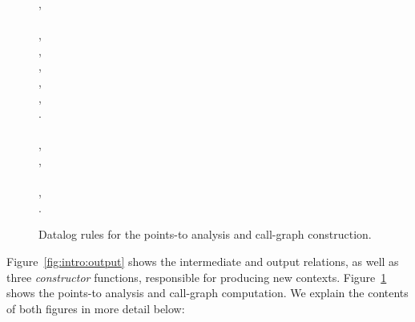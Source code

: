 \begin{figure}[tb!p]
\begin{datalog}
, \\
 \dlIf{} \\
    , \\
    , \\
    ,\\
    , \\
    ,\\
    . \\
\\
, \\
, \\
 \dlIf{} \\
    , \\
    .
\end{datalog}
\caption[]{Datalog rules for the points-to analysis and call-graph construction.}
\label{fig:intro:baserules}
\end{figure}

Figure~\ref{fig:intro:output} shows the intermediate and output relations, as well as three \emph{constructor} functions, responsible for producing new contexts. Figure~\ref{fig:intro:baserules} shows the points-to analysis and call-graph computation. We explain the contents of both figures in more detail below:

